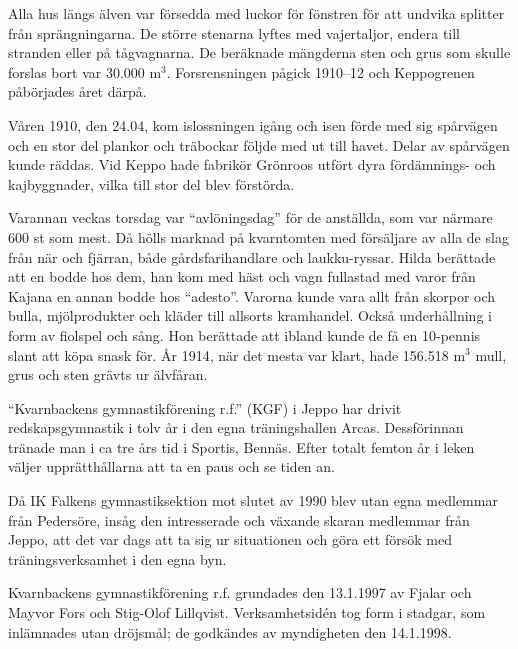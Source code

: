 
Alla hus längs älven var försedda med luckor för fönstren för att undvika splitter från sprängningarna. De större stenarna lyftes med vajertaljor, endera till stranden eller på tågvagnarna. De beräknade mängderna sten och grus som  skulle forslas bort var 30.000 m$^3$. Forsrensningen pågick 1910--12 och Keppogrenen påbörjades året därpå.

Våren 1910, den 24.04, kom islossningen igång och isen förde med sig spårvägen och en stor del plankor och träbockar följde med ut till havet. Delar av spårvägen kunde räddas. Vid Keppo hade fabrikör Grönroos utfört dyra fördämnings- och kajbyggnader, vilka till stor del blev förstörda.

Varannan veckas torsdag var ``avlöningsdag'' för de anställda, som var närmare 600 st som mest. Då hölls marknad på kvarntomten med försäljare av alla de slag från när och fjärran, både gårdsfarihandlare och laukku-ryssar. Hilda berättade att en bodde hos dem, han kom med häst och vagn fullastad med varor från Kajana en annan bodde hos ``adesto''. Varorna kunde vara allt från skorpor och bulla, mjölprodukter och kläder till allsorts kramhandel. Också underhållning i form av fiolspel och sång. Hon berättade att ibland kunde de få en 10-pennis slant att köpa snask för. År 1914, när det mesta var klart, hade 156.518 m$^3$ mull, grus och sten grävts ur älvfåran.




``Kvarnbackens gymnastikförening r.f.'' (KGF) i Jeppo har drivit redskapsgymnastik i tolv år i den egna träningshallen Arcas. Dessförinnan tränade man i ca tre års tid i Sportis, Bennäs. Efter totalt femton år i leken väljer upprätthållarna att ta en paus och se tiden an.

Då IK Falkens gymnastiksektion mot slutet av 1990 blev utan egna medlemmar från Pedersöre, insåg den intresserade och växande skaran medlemmar från Jeppo, att det var dags att ta sig ur situationen och göra ett försök med träningsverksamhet i den egna byn.

Kvarnbackens gymnastikförening r.f. grundades den 13.1.1997 av Fjalar och Mayvor Fors och Stig-Olof Lillqvist. Verksamhetsidén tog form i stadgar, som inlämnades utan dröjsmål; de godkändes av myndigheten den 14.1.1998.


